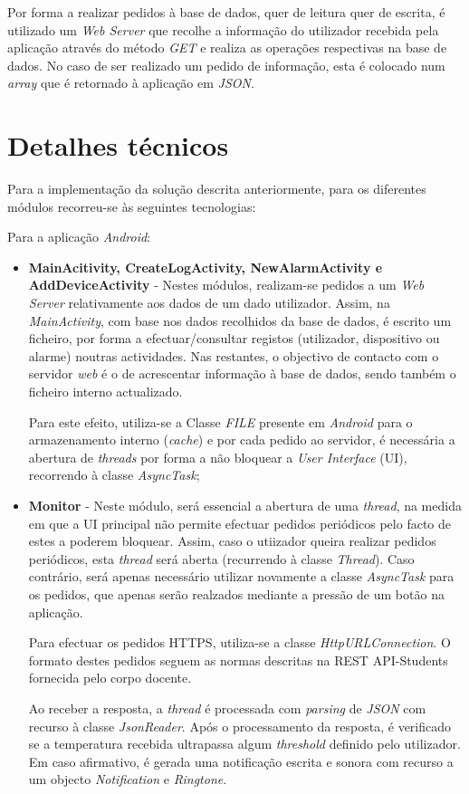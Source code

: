 \documentclass[a4paper]{article}
\begin{document}
Por forma a realizar pedidos à base de dados, quer de leitura quer de escrita, é utilizado um \textit{Web Server} que recolhe a informação do utilizador recebida pela aplicação através do método \textit{GET} e realiza as operações respectivas na base de dados. No caso de ser realizado um pedido de informação, esta é colocado num \textit{array} que é retornado à aplicação em \textit{JSON}.

\section{Detalhes técnicos}

Para a implementação da solução descrita anteriormente, para os diferentes módulos recorreu-se às seguintes tecnologias:

Para a aplicação \textit{Android}:
\begin{itemize}
\item \textbf{MainAcitivity, CreateLogActivity, NewAlarmActivity e AddDeviceActivity} - Nestes módulos, realizam-se pedidos a um \textit{Web Server} relativamente aos dados de um dado utilizador. Assim, na \textit{MainActivity}, com base nos dados recolhidos da base de dados, é escrito um ficheiro, por forma a efectuar/consultar registos (utilizador, dispositivo ou alarme) noutras actividades. Nas restantes, o objectivo de contacto com o servidor \textit{web} é o de acrescentar informação à base de dados, sendo também o ficheiro interno actualizado. 

Para este efeito, utiliza-se a Classe \textit{FILE} presente em \textit{Android} para o armazenamento interno (\textit{cache}) e por cada pedido ao servidor, é necessária a abertura de \textit{threads} por forma a não bloquear a \textit{User Interface} (UI), recorrendo à classe \textit{AsyncTask};

\item \textbf{Monitor} - Neste módulo, será essencial a abertura de uma \textit{thread}, na medida em que a UI principal não permite efectuar pedidos periódicos pelo facto de estes a poderem bloquear. Assim, caso o utiizador queira realizar pedidos periódicos, esta \textit{thread} será aberta (recurrendo à classe \textit{Thread}). Caso contrário, será apenas necessário utilizar novamente a classe \textit{AsyncTask} para os pedidos, que apenas serão realzados mediante a pressão de um botão na aplicação.

Para efectuar os pedidos HTTPS, utiliza-se a classe \textit{HttpURLConnection}. O formato destes pedidos seguem as normas descritas na REST API-Students fornecida pelo corpo docente.

Ao receber a resposta, a \textit{thread} é processada com \textit{parsing} de \textit{JSON} com recurso à classe \textit{JsonReader}. Após o processamento da resposta, é verificado se a temperatura recebida ultrapassa algum \textit{threshold} definido pelo utilizador. Em caso afirmativo, é gerada uma notificação escrita e sonora com recurso a um objecto \textit{Notification} e \textit{Ringtone}.
\end{itemize}
\end{document}
